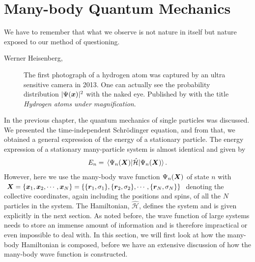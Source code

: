 \chapter{Many-body Quantum Mechanics} \label{chp:manybody}
\epigraph{We have to remember that what we observe is not nature in itself but
	nature exposed to our method of questioning.}{Werner Heisenberg, \supercite{heisenberg_across_1990}}
\begin{figure}[H]
	\centering
	\captionsetup[subfigure]{labelformat=empty}
	\caption{The first photograph of a hydrogen atom was captured by an ultra sensitive camera in 2013. One can actually see the probability distribution $|\Psi(\boldsymbol{{x}})|^2$ with the naked eye. Published by \citet{stodolna_hydrogen_2013} with the title \textit{Hydrogen atoms under magnification}.}
\end{figure}

\sloppy
In the previous chapter, the quantum mechanics of single particles was discussed. We presented the time-independent Schrödinger equation, and from that, we obtained a general expression of the energy of a stationary particle. The energy expression of a stationary many-particle system is almost identical and given by
\begin{equation}
E_n=\mel{\Psi_n(\bs{X})}{\hat{\mathcal{H}}}{\Psi_n(\bs{X})}.
\label{eq:energy}
\end{equation}
However, here we use the many-body wave function $\Psi_n(\boldsymbol{{X}})$ of state $n$ with $\boldsymbol{{X}}=\{\boldsymbol{{x}}_1,\boldsymbol{{x}}_2,\cdots,\boldsymbol{{x}}_N\}=\{\{\boldsymbol{{r}}_1, \sigma_1\}, \{\boldsymbol{{r}}_2, \sigma_2\},\cdots,\{\boldsymbol{{r}}_N, \sigma_N\}\}$ denoting the collective coordinates, again including the positions and spins, of all the $N$ particles in the system. The Hamiltonian, $\hat{\mathcal{H}}$, defines the system and is given explicitly in the next section. As noted before, the wave function of large systems needs to store an immense amount of information and is therefore impractical or even impossible to deal with. In this section, we will first look at how the many-body Hamiltonian is composed, before we have an extensive discussion of how the many-body wave function is constructed.


